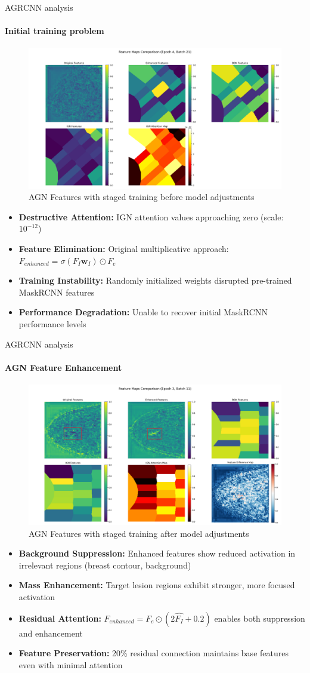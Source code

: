 \documentclass[8pt,aspectratio=169,xcolor=dvipsnames]{beamer}
\begin{document}
\begin{frame}{AGRCNN analysis}
\framesubtitle{Initial training problem}
\begin{figure}
    \centering
    \includegraphics[width=0.5\linewidth]{agn_results_1.png}
    \caption{AGN Features with staged training before model adjustments}
    \label{fig:agn_features_1}
\end{figure}
\begin{itemize}
    \item \textbf{Destructive Attention:} IGN attention values approaching zero (scale: $10^{-12}$)
    \item \textbf{Feature Elimination:} Original multiplicative approach: $F_{enhanced} = \sigma(F_I \mathbf{w}_I) \odot F_e$
    \item \textbf{Training Instability:} Randomly initialized weights disrupted pre-trained MaskRCNN features
    \item \textbf{Performance Degradation:} Unable to recover initial MaskRCNN performance levels
\end{itemize}
\end{frame}

\begin{frame}{AGRCNN analysis}
\framesubtitle{AGN Feature Enhancement}
\begin{figure}
    \centering
    \includegraphics[width=0.5\linewidth]{agn_results_2.png}
    \caption{AGN Features with staged training after model adjustments}
    \label{fig:agn_feature_analysis}
\end{figure}
\begin{itemize}
    \item \textbf{Background Suppression:} Enhanced features show reduced activation in irrelevant regions (breast contour, background)
    \item \textbf{Mass Enhancement:} Target lesion regions exhibit stronger, more focused activation
    \item \textbf{Residual Attention:} $F_{enhanced} = F_{e} \odot (2\hat{F_I} + 0.2)$ enables both suppression and enhancement
    \item \textbf{Feature Preservation:} 20\% residual connection maintains base features even with minimal attention
\end{itemize}
\end{frame}
\end{document}
